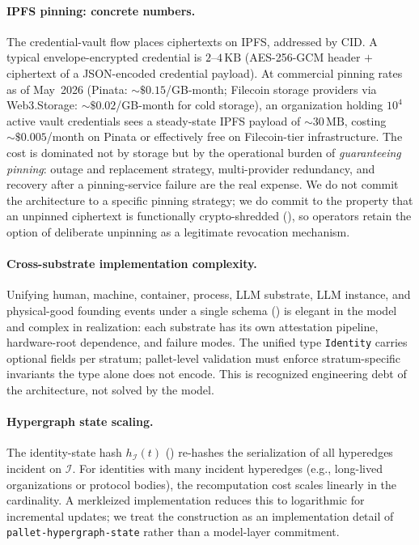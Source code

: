 \documentclass[11pt,a4paper,parskip=half-,DIV=12,headings=standardclasses]{scrartcl}
\theoremstyle{ncthm}
\theoremstyle{ncdef}
\newcommand{\identity}{\mathcal{I}}
\begin{document}
\paragraph{IPFS pinning: concrete numbers.} The credential-vault
flow places ciphertexts on IPFS, addressed by CID. A typical
envelope-encrypted credential is $2$--$4\,\text{KB}$ (AES-256-GCM
header $+$ ciphertext of a JSON-encoded credential payload). At
commercial pinning rates as of May~2026 (Pinata: ${\sim}\$0.15$/GB-month;
Filecoin storage providers via Web3.Storage: ${\sim}\$0.02$/GB-month
for cold storage), an organization holding $10^4$ active vault
credentials sees a steady-state IPFS payload of ${\sim}30\,\text{MB}$,
costing ${\sim}\$0.005$/month on Pinata or effectively free on
Filecoin-tier infrastructure. The cost is dominated not by storage
but by the operational burden of \emph{guaranteeing pinning}: outage
and replacement strategy, multi-provider redundancy, and recovery
after a pinning-service failure are the real expense. We do not
commit the architecture to a specific pinning strategy; we do commit
to the property that an unpinned ciphertext is functionally
crypto-shredded (), so operators retain
the option of deliberate unpinning as a legitimate revocation
mechanism.

\paragraph{Cross-substrate implementation complexity.} Unifying
human, machine, container, process, LLM substrate, LLM instance, and
physical-good founding events under a single schema
() is elegant in the model and complex in
realization: each substrate has its own attestation pipeline,
hardware-root dependence, and failure modes. The unified type
\texttt{Identity} carries optional fields per stratum; pallet-level
validation must enforce stratum-specific invariants the type alone
does not encode. This is recognized engineering debt of the
architecture, not solved by the model.

\paragraph{Hypergraph state scaling.} The identity-state hash
$h_{\identity}(t)$ () re-hashes the
serialization of all hyperedges incident on $\identity$. For
identities with many incident hyperedges (e.g., long-lived
organizations or protocol bodies), the recomputation cost scales
linearly in the cardinality. A merkleized implementation reduces this
to logarithmic for incremental updates; we treat the construction as
an implementation detail of \texttt{pallet-hypergraph-state} rather
than a model-layer commitment.
\end{document}
